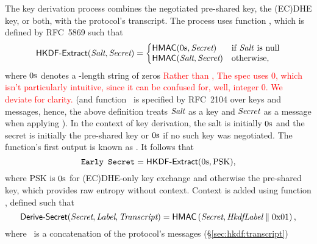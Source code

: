 The key derivation process combines the negotiated pre-shared key, the 
(EC)DHE key, or both, with the protocol's transcript. The process 
uses function \HKDFExtract, which is defined by RFC~5869
such that 
%
\[
  \HKDFExtract(\TLSHKDFSalt,\TLSHKDFSecret) = 
  \left\{
    \begin{matrix*}[l]
      \HMACHash(\zeros,\TLSHKDFSecret)             & \textrm{if \TLSHKDFSalt\ is null}\\
      \HMACHash(\TLSHKDFSalt,\TLSHKDFSecret)  & \textrm{otherwise},
    \end{matrix*}
  \right.
\]
%
where $0\textrm{s}$ denotes a \HashLength-length string of zeros
\ifSpecNotes
\textcolor{red}{Rather than \zeros, The spec uses 0, which isn't particularly intuitive, 
since it can be confused for, well, integer 0. We deviate for clarity.}
\fi
(and function \HMACHash\ is specified by RFC~2104 over keys and messages, hence, the above
definition treats $\textit{Salt}$ as a key and $\textit{Secret}$ 
as a message when applying \HMACHash).
In the context of key derivation, 
the salt is initially $0\textrm{s}$ 
and the secret is initially the pre-shared key or $0\textrm{s}$ if no such 
key was negotiated. The function's first output is known 
as \TLSEarlySecret. It follows that
\[
  \texttt{Early Secret} = \textsf{HKDF-Extract}(0\textrm{s},\textrm{PSK}),
\]
where PSK is $0\textrm{s}$ for (EC)DHE-only key exchange and
otherwise the pre-shared key, which provides raw 
entropy without context.
Context is added using function \DeriveSecret, defined 
such that 
%
\[
  \textsf{Derive-Secret}(\textit{Secret},\textit{Label},\textit{Transcript}) 
          = \textsf{HMAC}\left(\textit{Secret}, \textit{HkdfLabel} \parallel 0\textrm{x}01\right),
\]
%
where \TLSHandshakeMessage\ is a concatenation of the protocol's messages (\S\ref{sec:hkdf:transcript})
